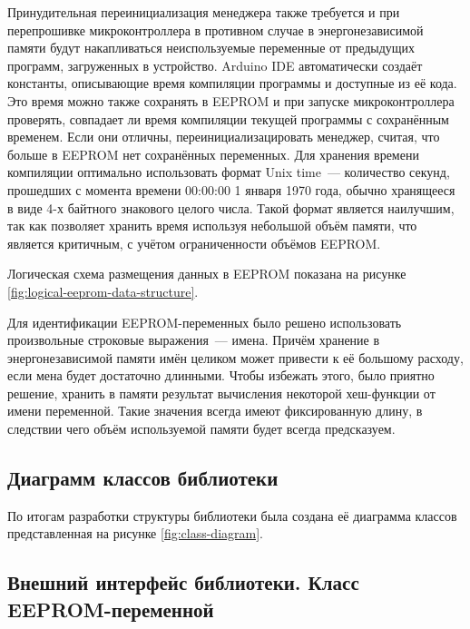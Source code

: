 Принудительная переинициализация менеджера также требуется и при перепрошивке микроконтроллера в противном случае в энергонезависимой памяти будут накапливаться неиспользуемые переменные от предыдущих программ, загруженных в устройство.
Arduino IDE автоматически создаёт константы, описывающие время компиляции программы и доступные из её кода.
Это время можно также сохранять в EEPROM и при запуске микроконтроллера проверять, совпадает ли время компиляции текущей программы с сохранённым временем.
Если они отличны, переинициализацировать менеджер, считая, что больше в EEPROM нет сохранённых переменных.
Для хранения времени компиляции оптимально использовать формат Unix time~--- количество секунд, прошедших с момента времени 00:00:00 1 января 1970 года, обычно хранящееся в виде 4-х байтного знакового целого числа.
Такой формат является наилучшим, так как позволяет хранить время используя небольшой объём памяти, что является критичным, с учётом ограниченности объёмов EEPROM.

Логическая схема размещения данных в EEPROM показана на рисунке \ref{fig:logical-eeprom-data-structure}.

Для идентификации EEPROM-переменных было решено использовать произвольные строковые выражения~--- имена.
Причём хранение в энергонезависимой памяти имён целиком может привести к её большому расходу, если мена будет достаточно длинными.
Чтобы избежать этого, было приятно решение, хранить в памяти результат вычисления некоторой хеш-функции от имени переменной.
Такие значения всегда имеют фиксированную длину, в следствии чего объём используемой памяти будет всегда предсказуем.



\subsection{Диаграмм классов библиотеки}

По итогам разработки структуры библиотеки была создана её диаграмма классов представленная на рисунке \ref{fig:class-diagram}.


\subsection{Внешний интерфейс библиотеки. Класс EEPROM-переменной}

